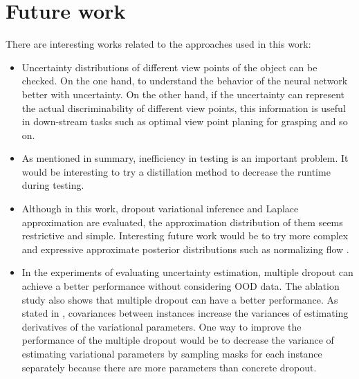 \section{Future work}
There are interesting works related to the approaches used in this work:
\begin{itemize}
	\item Uncertainty distributions of different view points of the object can be checked. On the one hand, to understand the behavior of the neural network better with uncertainty. On the other hand, if the uncertainty can represent the actual discriminability of different view points, this information is useful in down-stream tasks such as optimal view point planing for grasping and so on. 
	\item As mentioned in summary, inefficiency in testing is an important problem. It would be interesting to try a distillation method to decrease the runtime during testing.
	\item Although in this work, dropout variational inference and Laplace approximation are evaluated, the approximation distribution of them seems restrictive and simple. Interesting future work would be to try more complex and expressive approximate posterior distributions such as normalizing flow .
	\item In the experiments of evaluating uncertainty estimation, multiple dropout can achieve a better performance without considering OOD data. The ablation study also shows that multiple dropout can have a better performance. As stated in \cite{kingma2015variational}, covariances between instances increase the variances of estimating derivatives of the variational parameters. One way to improve the performance of the multiple dropout would be to decrease the variance of estimating variational parameters by sampling masks for each instance separately because there are more parameters than concrete dropout. 
\end{itemize}